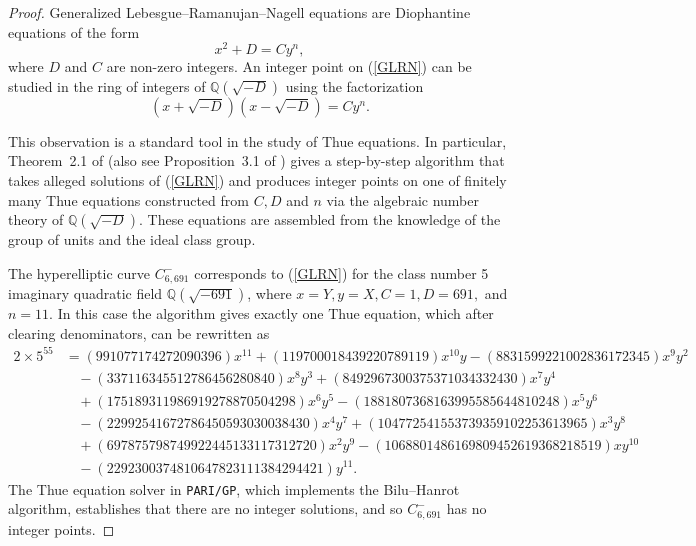 \documentclass[12pt]{amsart}
\newcommand{\Q}{\mathbb{Q}}
\numberwithin{equation}{section}
\begin{document}
\begin{proof}
Generalized Lebesgue--Ramanujan--Nagell equations are Diophantine equations of the form
\begin{equation}\label{GLRN}
x^2+D=Cy^n,
\end{equation}
where $D$ and $C$ are non-zero integers. An integer point on (\ref{GLRN}) can be studied in the ring of integers
of $\Q(\sqrt{-D})$
using the factorization
$$(x+\sqrt{-D})(x-\sqrt{-D}) =Cy^n.
$$

This observation is a standard tool in the study of Thue equations. In particular, 
Theorem~2.1 of  \cite{Barros} (also see Proposition~3.1 of \cite{BMS}) gives a step-by-step algorithm that takes alleged solutions of (\ref{GLRN}) and produces integer points on one
of finitely many Thue equations constructed from $C, D$ and $n$ via the algebraic number theory of $\Q(\sqrt{-D})$.
 These equations are assembled from the knowledge of the group of units and the
ideal class group.

The  hyperelliptic curve $C^{-}_{6,691}$ corresponds to (\ref{GLRN}) for the class number 5 imaginary quadratic field
$\Q(\sqrt{-691})$, where $x=Y, y=X, C=1, D=691,$ and $n=11.$  In this case the algorithm gives exactly one Thue equation, which after clearing denominators, can be rewritten as
\small
\begin{displaymath}
\begin{split}
2\times5^{55}&=(991077174272090396)x^{11} + (119700018439220789119)x^{10}y
- (8831599221002836172345)x^9y^2\\
&\ \ \ \ -(337116345512786456280840)x^8y^3 
+ (8492967300375371034332430)x^7y^4\\
&\ \ \ \  + (175189311986919278870504298)x^6y^5 
- (1881807368163995585644810248)x^5y^6\\
&\ \ \ \  - (22992541672786450593030038430)x^4y^7 
+ (104772541553739359102253613965)x^3y^8\\
&\ \ \ \  + (697875798749922445133117312720)x^2y^9 
- (1068801486169809452619368218519)xy^{10}\\
&\ \ \ \  - (2292300374810647823111384294421)y^{11}.
\end{split}
\end{displaymath}
\normalsize
The Thue equation solver in \texttt{PARI/GP}, which implements the Bilu--Hanrot algorithm, establishes that there are no integer solutions, and so $C^{-}_{6,691}$ has no integer points.


\end{proof}
\end{document}
